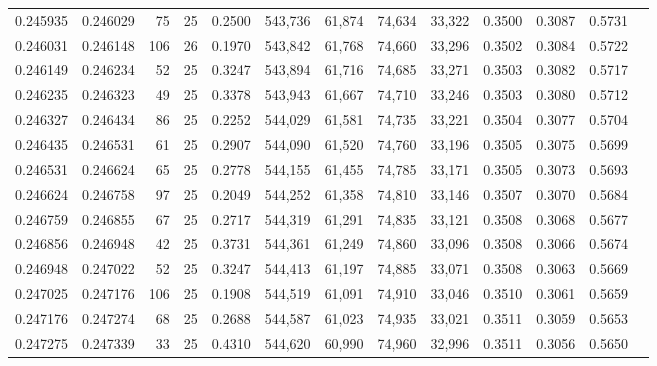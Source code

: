 \begin{tabular}{rrrrrrrrrrrrr}
0.245935 & 0.246029 &    75 &  25 &                                     0.2500 & 543,736 &  61,874 &  74,634 &  33,322 & 0.3500 & 0.3087 & 0.5731 \\
0.246031 & 0.246148 &   106 &  26 &                                     0.1970 & 543,842 &  61,768 &  74,660 &  33,296 & 0.3502 & 0.3084 & 0.5722 \\
0.246149 & 0.246234 &    52 &  25 &                                     0.3247 & 543,894 &  61,716 &  74,685 &  33,271 & 0.3503 & 0.3082 & 0.5717 \\
0.246235 & 0.246323 &    49 &  25 &                                     0.3378 & 543,943 &  61,667 &  74,710 &  33,246 & 0.3503 & 0.3080 & 0.5712 \\
0.246327 & 0.246434 &    86 &  25 &                                     0.2252 & 544,029 &  61,581 &  74,735 &  33,221 & 0.3504 & 0.3077 & 0.5704 \\
0.246435 & 0.246531 &    61 &  25 &                                     0.2907 & 544,090 &  61,520 &  74,760 &  33,196 & 0.3505 & 0.3075 & 0.5699 \\
0.246531 & 0.246624 &    65 &  25 &                                     0.2778 & 544,155 &  61,455 &  74,785 &  33,171 & 0.3505 & 0.3073 & 0.5693 \\
0.246624 & 0.246758 &    97 &  25 &                                     0.2049 & 544,252 &  61,358 &  74,810 &  33,146 & 0.3507 & 0.3070 & 0.5684 \\
0.246759 & 0.246855 &    67 &  25 &                                     0.2717 & 544,319 &  61,291 &  74,835 &  33,121 & 0.3508 & 0.3068 & 0.5677 \\
0.246856 & 0.246948 &    42 &  25 &                                     0.3731 & 544,361 &  61,249 &  74,860 &  33,096 & 0.3508 & 0.3066 & 0.5674 \\
0.246948 & 0.247022 &    52 &  25 &                                     0.3247 & 544,413 &  61,197 &  74,885 &  33,071 & 0.3508 & 0.3063 & 0.5669 \\
0.247025 & 0.247176 &   106 &  25 &                                     0.1908 & 544,519 &  61,091 &  74,910 &  33,046 & 0.3510 & 0.3061 & 0.5659 \\
0.247176 & 0.247274 &    68 &  25 &                                     0.2688 & 544,587 &  61,023 &  74,935 &  33,021 & 0.3511 & 0.3059 & 0.5653 \\
0.247275 & 0.247339 &    33 &  25 &                                     0.4310 & 544,620 &  60,990 &  74,960 &  32,996 & 0.3511 & 0.3056 & 0.5650 \\

\end{tabular}
